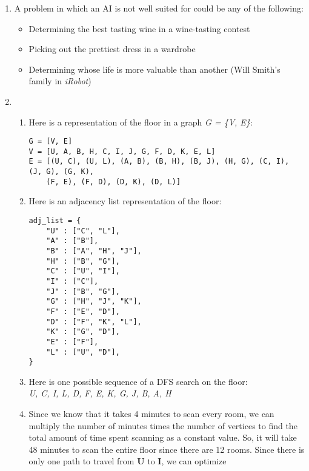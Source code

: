 \documentclass{article}
\begin{document}
\begin{enumerate}
\begin{enumerate}
    \end{enumerate}
    \item %
    A problem in which an AI is not well suited for could be any of the following:
    \begin{itemize}
        \item
        Determining the best tasting wine in a wine-tasting contest
        \item
        Picking out the prettiest dress in a wardrobe
        \item
        Determining whose life is more valuable than another (Will Smith's family in \textit{iRobot})
    \end{itemize}
    \item %
        \begin{enumerate}
            \item
            \lstset{language=python}
            Here is a representation of the floor in a graph \textit{G = \{V, E\}}:
            \begin{lstlisting}[frame=single]
G = [V, E]
V = [U, A, B, H, C, I, J, G, F, D, K, E, L]
E = [(U, C), (U, L), (A, B), (B, H), (B, J), (H, G), (C, I), (J, G), (G, K),
    (F, E), (F, D), (D, K), (D, L)]
            \end{lstlisting}
            \item
            Here is an adjacency list representation of the floor:
            \begin{lstlisting}
adj_list = {
    "U" : ["C", "L"],
    "A" : ["B"],
    "B" : ["A", "H", "J"],
    "H" : ["B", "G"],
    "C" : ["U", "I"],
    "I" : ["C"],
    "J" : ["B", "G"],
    "G" : ["H", "J", "K"],
    "F" : ["E", "D"],
    "D" : ["F", "K", "L"],
    "K" : ["G", "D"],
    "E" : ["F"],
    "L" : ["U", "D"],
}
            \end{lstlisting}
            \item
            Here is one possible sequence of a DFS search on the floor:
            \\\textit{U, C, I, L, D, F, E, K, G, J, B, A, H}
            \item
            Since we know that it takes 4 minutes to scan every room, we can multiply
            the number of minutes times the number of vertices to find the total amount of time
            spent scanning as a constant value. So, it will take 48 minutes to scan the entire
            floor since there are 12 rooms. Since there is only one path to travel from \textbf{U} to \textbf{I}, we can optimize

\end{enumerate}
\end{enumerate}
\end{document}

